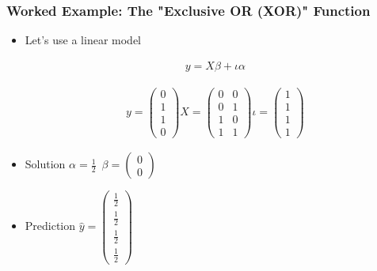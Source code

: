 \documentclass[
  shownotes,
  xcolor={svgnames},
  hyperref={colorlinks,citecolor=DarkBlue,linkcolor=DarkRed,urlcolor=DarkBlue}
  , aspectratio=169]{beamer}
\begin{document}
\begin{frame}
\frametitle{Worked Example: The "Exclusive OR (XOR)" Function}

\begin{itemize}
\item Let's use a linear model 

\begin{align}
y = X\beta + \iota \alpha 
\end{align}


 \begin{align}
 y=\left(\begin{array}{c}
0\\
1\\
1\\
0
\end{array}\right)X=\left(\begin{array}{cc}
0 & 0\\
0 &1\\
1 & 0\\
1 & 1
\end{array}\right)\iota=\left(\begin{array}{c}
1\\
1\\
1\\
1
\end{array}\right)
 \end{align}

\item Solution $ \alpha=\frac{1}{2} \,\,\,\beta=\left(\begin{array}{c}
0\\
0
\end{array}\right)
$


\item Prediction $\hat{y}=\left(\begin{array}{c}
\frac{1}{2}\\
\frac{1}{2}\\
\frac{1}{2}\\
\frac{1}{2}
\end{array}\right)$
\end{itemize}


\end{frame}
\end{document}
